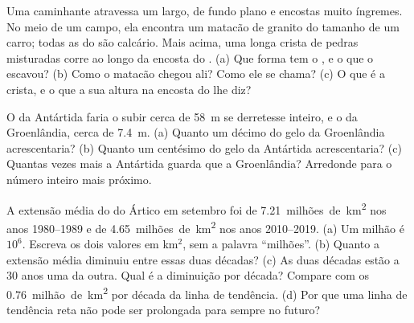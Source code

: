 \begin{exercise}[$\star\star$]\label{exo:g8:ice-on-earth:9}
Uma caminhante atravessa um  largo, de fundo plano e encostas muito
íngremes. No meio de um campo, ela encontra um matacão de granito do
tamanho de um carro; todas as  do  são calcário. Mais acima, uma
longa crista de pedras misturadas corre ao longo da encosta do .
(a) Que forma tem o , e o que o escavou? (b) Como o matacão chegou
ali? Como ele se chama? (c) O que é a crista, e o que a sua altura na
encosta do  lhe diz?
\end{exercise}

\begin{exercise}[$\star\star$]\label{exo:g8:ice-on-earth:10}
O  da Antártida faria o  subir cerca de \qty{58}{m} se
derretesse inteiro, e o  da Groenlândia, cerca de
\qty{7.4}{m}. (a) Quanto um décimo do gelo da Groenlândia acrescentaria?
(b) Quanto um centésimo do gelo da Antártida acrescentaria? (c) Quantas
vezes mais a Antártida guarda que a Groenlândia? Arredonde para o número
inteiro mais próximo.
\end{exercise}

\begin{exercise}[$\star\star\star$]\label{exo:g8:ice-on-earth:11}
A extensão média do  do Ártico em setembro foi de
\num{7.21}~milhões~de~\unit{km^2} nos anos 1980--1989 e de
\num{4.65}~milhões~de~\unit{km^2} nos anos 2010--2019. (a) Um milhão é
$10^6$. Escreva os dois valores em km$^2$, sem a palavra ``milhões''.
(b) Quanto a extensão média diminuiu entre essas duas décadas?
(c) As duas décadas estão a 30 anos uma da outra. Qual é a diminuição por
década? Compare com os \num{0.76}~milhão~de~\unit{km^2} por década da linha de tendência.
(d) Por que uma linha de tendência reta não pode ser prolongada para
sempre no futuro?
\end{exercise}

